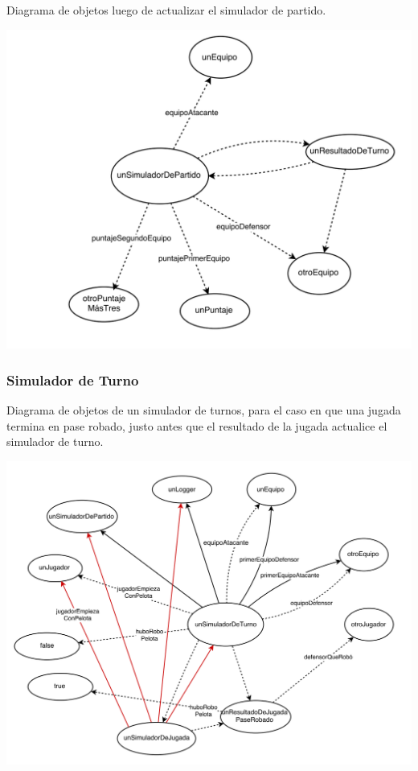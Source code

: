 Diagrama de objetos luego de actualizar el simulador de partido.

\begin{center}
\includegraphics[width=15cm]{diagramas/DO2}
\end{center}

\subsubsection{Simulador de Turno}

Diagrama de objetos de un simulador de turnos, para el caso en que una jugada termina en pase robado, justo antes que el resultado de la jugada actualice el simulador de turno.

\begin{center}
\includegraphics[width=15cm]{diagramas/DO3}
\end{center}

